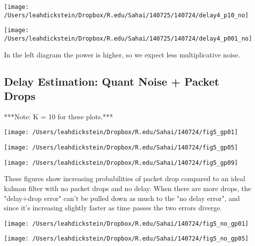 \documentclass[leqno,twocolumn]{article}
\begin{document}
\begin{minipage}[c]{0.5\textwidth}
\texttt{[image: /Users/leahdickstein/Dropbox/R.edu/Sahai/140725/140724/delay4\_p10\_no]}
\end{minipage}
\begin{minipage}[c]{0.5\textwidth}
\texttt{[image: /Users/leahdickstein/Dropbox/R.edu/Sahai/140725/140724/delay4\_p001\_no]}
\end{minipage}

In the left diagram the power is higher, so we expect less multiplicative noise.

\subsection{Delay Estimation: Quant Noise + Packet Drops}
***Note: K = 10 for these plots.***

\begin{minipage}[c]{0.5\textwidth}
\texttt{[image: /Users/leahdickstein/Dropbox/R.edu/Sahai/140724/fig5\_gp01]}
\end{minipage}
\begin{minipage}[c]{0.5\textwidth}
\texttt{[image: /Users/leahdickstein/Dropbox/R.edu/Sahai/140724/fig5\_gp05]}
\end{minipage}

\begin{minipage}[c]{0.5\textwidth}
\texttt{[image: /Users/leahdickstein/Dropbox/R.edu/Sahai/140724/fig5\_gp09]}
\end{minipage}
\begin{minipage}[b]{0.5\textwidth}
These figures show increasing probabilities of packet drop compared to an ideal kalman filter with no packet drops and no delay. When there are more drops, the "delay+drop error" can't be pulled down as much to the "no delay error", and since it's increasing slightly faster as time passes the two errors diverge.
\end{minipage}

\begin{minipage}[c]{0.5\textwidth}
\texttt{[image: /Users/leahdickstein/Dropbox/R.edu/Sahai/140724/fig5\_no\_gp01]}
\end{minipage}
\begin{minipage}[c]{0.5\textwidth}
\texttt{[image: /Users/leahdickstein/Dropbox/R.edu/Sahai/140724/fig5\_no\_gp05]}
\end{minipage}
\end{document}
